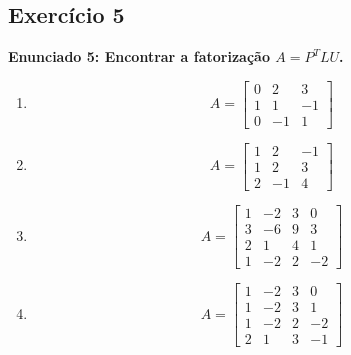 \documentclass{article}
\begin{document}
\subsection*{Exerc\'icio 5}
\textbf{Enunciado 5: Encontrar a fatoriza\c{c}\~ao $A=P^TLU$.}
\begin{enumerate}
    \item 
    \[
        A=\begin{bmatrix}
            0 & 2 & 3 \\
            1 & 1 & -1 \\
            0 & -1 & 1
        \end{bmatrix}
    \]
    \item 
    \[
        A=\begin{bmatrix}
            1 & 2 & -1 \\
            1 & 2 & 3 \\
            2 & -1 & 4
        \end{bmatrix}
    \]
    \item 
    \[
        A=\begin{bmatrix}
            1 & -2 & 3 & 0 \\
            3 & -6 & 9 & 3 \\
            2 & 1 & 4 & 1 \\
            1 & -2 & 2 & -2
        \end{bmatrix}
    \]
    \item 
    \[
        A=\begin{bmatrix}
            1 & -2 & 3 & 0 \\
            1 & -2 & 3 & 1 \\
            1 & -2 & 2 & -2 \\
            2 & 1 & 3 & -1
        \end{bmatrix}
    \]
\end{enumerate}

\end{document}
